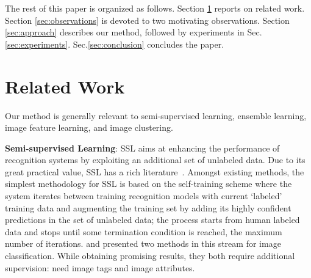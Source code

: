 The rest of this paper is organized as follows. Section
\ref{sec:related} reports on related work. Section
\ref{sec:observations} is devoted to two motivating observations. 
Section \ref{sec:approach} describes our method, followed by experiments
in Sec.\ref{sec:experiments}. Sec.\ref{sec:conclusion} concludes the
paper.


\section{Related Work}
\label{sec:related}
Our method is generally relevant to semi-supervised
learning, ensemble learning,  image feature learning, and image clustering.

\textbf{Semi-supervised Learning}: SSL aims at enhancing the
performance of recognition systems by exploiting an additional set of
unlabeled data. Due to its great practical value, SSL has a rich
literature~\citep{book06:ssl, Zhu:ISL:2009}. Amongst existing methods,
the simplest methodology for SSL is based on the self-training scheme
\citep{co-training:98} where the system iterates between training
recognition models with current `labeled' training data and augmenting
the training set by adding its highly confident predictions in the set
of unlabeled data; the process starts from human labeled data and
stops until some termination condition is reached, \eg the maximum
number of iterations.  \citet{Guillaumin:cvpr:10} and \citet{Semi:eccv12} presented two methods in this stream for image classification. While
obtaining promising results, they both require additional supervision:
\citet{Guillaumin:cvpr:10} need image tags and \citet{Semi:eccv12}
image attributes.



